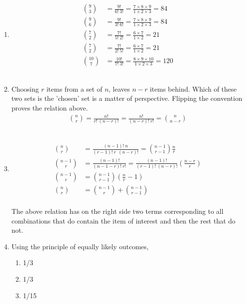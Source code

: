 \begin{enumerate}
	\item \begin{subequations}
		\begin{align}
			\binom{9}{3} &= \frac{9!}{6!\ 3!} = \frac{7 \times 8 \times 9}{1 \times 2 \times 3} = 84 \\
			\binom{9}{6} &= \frac{9!}{3!\ 6!} = \frac{7 \times 8 \times 9}{1 \times 2 \times 3} = 84 \\
			\binom{7}{2} &= \frac{7!}{5!\ 2!} = \frac{6 \times 7}{1 \times 2} = 21 \\
			\binom{7}{2} &= \frac{7!}{2!\ 5!} = \frac{6 \times 7}{1 \times 2} = 21 \\
			\binom{10}{7} &= \frac{10!}{7!\ 3!} = \frac{8 \times 9 \times 10}{1 \times 2 \times 3} = 120
		\end{align}
	\end{subequations} \\
	
	\item Choosing $ r $ items from a set of $ n $, leaves $ n-r $ items behind. Which of these two sets is the 'chosen' set is a matter of perspective. Flipping the convention proves the relation above.
	\begin{align}
		\binom{n}{r} = \frac{n!}{r!\ (n-r)!} = \frac{n!}{(n-r)!\ r!} = \binom{n}{n-r}
	\end{align}\\
	
	\item \begin{subequations}	
		\begin{align}
			\binom{n}{r} &= \frac{(n - 1)!\ n}{(r - 1)!\ r\ \ (n-r)!} = \binom{n-1}{r-1} \frac{n}{r} \\
			\binom{n-1}{r} &= \frac{(n-1)!}{(n-1-r)!\ r!} = \frac{(n-1)!}{(r-1)!\ (n-r)!} \left( \frac{n-r}{r} \right) \\
			\binom{n-1}{r} &= \binom{n-1}{r-1} \left( \frac{n}{r} - 1 \right) \\
			\binom{n}{r} &= \binom{n-1}{r} + \binom{n-1}{r-1} 
		\end{align}
	\end{subequations} \\
	
	The above relation has on the right side two terms corresponding to all combinations that do contain the item of interest and then the rest that do not.\\
	
	\item Using the principle of equally likely outcomes, 
	\begin{enumerate}
		\item 1/3 
		\item 1/3 
		\item 1/15
	\end{enumerate}
	

\end{enumerate}
